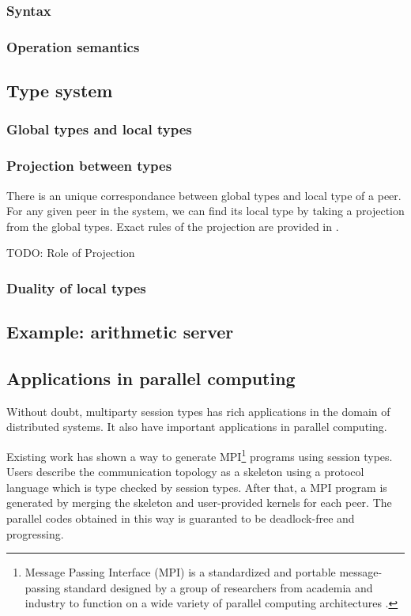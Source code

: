 \subsubsection{Syntax}
\subsubsection{Operation semantics}
\subsection{Type system}
\subsubsection{Global types and local types}
\subsubsection{Projection between types}
There is an unique correspondance between global types and local type of a peer. For any given peer in the system, we can find its local type by taking a projection from the global types. Exact rules of the projection are provided in \cite{coppoGentleIntroductionMultiparty2015}.

TODO: Role of Projection
\subsubsection{Duality of local types}
\subsection{Example: arithmetic server}
\subsection{Applications in parallel computing}
Without doubt, multiparty session types has rich applications in the domain of distributed systems. It also have important applications in parallel computing. 

Existing work\cite{ngSafeMPICode} has shown a way to generate MPI\footnote{Message Passing Interface (MPI) is a standardized and portable message-passing standard designed by a group of researchers from academia and industry to function on a wide variety of parallel computing architectures \cite{MessagePassingInterface2018}.} programs using session types. Users describe the communication topology as a skeleton using a protocol language which is type checked by session types. After that, a MPI program is generated by merging the skeleton and user-provided kernels for each peer. The parallel codes obtained in this way is guaranted to be deadlock-free and progressing. 

